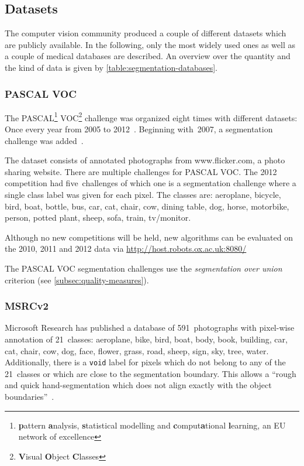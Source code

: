 
\subsection{Datasets}

The computer vision community produced a couple of different datasets which are
publicly available. In the following, only the most widely used ones as well as
a couple of medical databases are described. An overview over the quantity and
the kind of data is given by
\cref{table:segmentation-databases}.


\subsubsection{PASCAL VOC}

The PASCAL\footnote{\textbf{p}attern \textbf{a}nalysis, \textbf{s}tatistical
modelling and \textbf{c}omput\textbf{a}tional \textbf{l}earning, an EU network
of excellence} VOC\footnote{\textbf{V}isual \textbf{O}bject \textbf{C}lasses}
challenge was organized eight times with different datasets: Once every year
from 2005 to 2012~\cite{pascal-voc-2012}. Beginning with~2007, a segmentation
challenge was added~\cite{pascal-voc-2007}.

The dataset consists of annotated photographs from www.flicker.com, a photo
sharing website. There are multiple challenges for PASCAL VOC. The 2012
competition had five~challenges of which one is a segmentation challenge where
a single class label was given for each pixel. The classes are: aeroplane,
bicycle, bird, boat, bottle, bus, car, cat, chair, cow, dining table, dog,
horse, motorbike, person, potted plant, sheep, sofa, train, tv/monitor.

Although no new competitions will be held, new algorithms can be evaluated on
the 2010, 2011 and 2012 data via
\href{http://host.robots.ox.ac.uk:8080/}{http://host.robots.ox.ac.uk:8080/}

The PASCAL VOC segmentation challenges use the \textit{segmentation over union}
criterion (see \cref{subsec:quality-measures}).


\subsubsection{MSRCv2}\label{subsubsec:MSRCv2}

Microsoft Research has published a database of 591~photographs with pixel-wise
annotation of 21~classes: aeroplane, bike, bird, boat, body, book, building,
car, cat, chair, cow, dog, face, flower, grass, road, sheep, sign, sky, tree,
water. Additionally, there is a \texttt{void} label for pixels which do not
belong to any of the 21~classes or which are close to the segmentation
boundary. This allows a \enquote{rough and quick hand-segmentation which does
not align exactly with the object boundaries}~\cite{shotton2006textonboost}.

